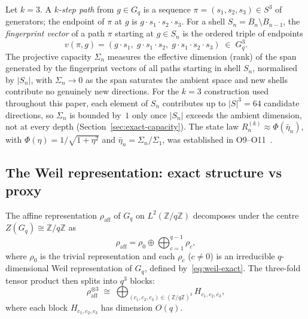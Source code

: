     Let $k=3$.
    A \emph{$k$-step path} from $g\in G_q$ is a sequence $\pi=(s_1,s_2,s_3)\in S^3$
    of generators; the endpoint of $\pi$ at $g$ is $g\cdot s_1\cdot s_2\cdot s_3$.
    For a shell $S_n = B_n\setminus B_{n-1}$, the \emph{fingerprint vector} of
    a path $\pi$ starting at $g\in S_n$ is the ordered triple of endpoints
    \begin{equation}
      v(\pi,g) = (g\cdot s_1,\; g\cdot s_1\cdot s_2,\; g\cdot s_1\cdot s_2\cdot s_3)
      \;\in\; G_q^3.
    \end{equation}
    The projective capacity $\Sigma_n$ measures the effective dimension (rank) of the span
    generated by the fingerprint vectors of all paths starting in shell $S_n$,
    normalised by $|S_n|$, with $\Sigma_n\to 0$ as the span saturates the ambient space and
    new shells contribute no genuinely new directions.
    For the $k=3$ construction used throughout this paper, each element of $S_n$ contributes
    up to $|S|^3=64$ candidate directions, so $\Sigma_n$ is bounded by~$1$ only once
    $|S_n|$ exceeds the ambient dimension, not at every depth (Section~\ref{sec:exact-capacity}).
    The state law $R_n^{(k)}\approx\Phi(\bar{\eta}_n)$, with
    $\Phi(\eta)=1/\sqrt{1+\eta^2}$ and $\bar{\eta}_n=\Sigma_n/\Sigma_1$, was
    established in O9--O11~\cite{Beau2026a13,Beau2026a14,Beau2026a15}.

  \subsection{The Weil representation: exact structure vs proxy}
    \label{sec:weil-exact-vs-proxy}

    The affine representation $\rho_{\mathrm{aff}}$ of $G_q$ on $L^2(\mathbb{Z}/q\mathbb{Z})$
    decomposes under the centre $Z(G_q)\cong\mathbb{Z}/q\mathbb{Z}$ as
    \begin{equation}
      \rho_{\mathrm{aff}} = \rho_0 \oplus \bigoplus_{c=1}^{q-1} \rho_c,
    \end{equation}
    where $\rho_0$ is the trivial representation and each $\rho_c$ ($c\neq 0$) is an
    irreducible $q$-dimensional Weil representation of $G_q$, defined by~\eqref{eq:weil-exact}.
    The three-fold tensor product then splits into $q^3$ blocks:
    \begin{equation}
      \rho_{\mathrm{aff}}^{\otimes 3}
      \;\cong\; \bigoplus_{(c_1,c_2,c_3)\in(\mathbb{Z}/q\mathbb{Z})^3}
      H_{c_1,c_2,c_3},
    \end{equation}
    where each block $H_{c_1,c_2,c_3}$ has dimension $O(q)$.

